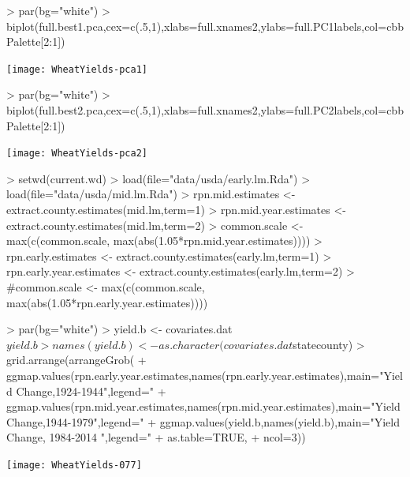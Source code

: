 \documentclass{report}
\begin{document}
\begin{Schunk}
\begin{Sinput}
> par(bg="white")
> biplot(full.best1.pca,cex=c(.5,1),xlabs=full.xnames2,ylabs=full.PC1labels,col=cbbPalette[2:1])
\end{Sinput}
\end{Schunk}
\texttt{[image: WheatYields-pca1]}

\begin{Schunk}
\begin{Sinput}
> par(bg="white")
> biplot(full.best2.pca,cex=c(.5,1),xlabs=full.xnames2,ylabs=full.PC2labels,col=cbbPalette[2:1])
\end{Sinput}
\end{Schunk}
\texttt{[image: WheatYields-pca2]}



\begin{Schunk}
\end{Schunk}

\begin{Schunk}
\begin{Sinput}
> setwd(current.wd)
> load(file="data/usda/early.lm.Rda")
> load(file="data/usda/mid.lm.Rda")
> rpn.mid.estimates <- extract.county.estimates(mid.lm,term=1)
> rpn.mid.year.estimates <- extract.county.estimates(mid.lm,term=2)
> common.scale <- max(c(common.scale, max(abs(1.05*rpn.mid.year.estimates))))
> rpn.early.estimates <- extract.county.estimates(early.lm,term=1)
> rpn.early.year.estimates <- extract.county.estimates(early.lm,term=2)
> #common.scale <- max(c(common.scale, max(abs(1.05*rpn.early.year.estimates))))
\end{Sinput}
\end{Schunk}



\begin{Schunk}
\begin{Sinput}
> par(bg="white")
> yield.b <- covariates.dat$yield.b
> names(yield.b) <- as.character(covariates.dat$statecounty)
> grid.arrange(arrangeGrob(
+    ggmap.values(rpn.early.year.estimates,names(rpn.early.year.estimates),main="Yield Change,1924-1944",legend="%
+    ggmap.values(rpn.mid.year.estimates,names(rpn.mid.year.estimates),main="Yield Change,1944-1979",legend="%
+    ggmap.values(yield.b,names(yield.b),main="Yield Change, 1984-2014 ",legend="%
+    as.table=TRUE,
+    ncol=3))
\end{Sinput}
\end{Schunk}
\texttt{[image: WheatYields-077]}
\end{document}
